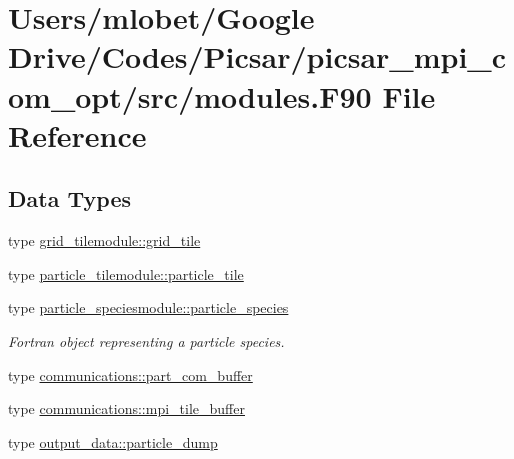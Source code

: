 \hypertarget{modules_8_f90}{}\section{Users/mlobet/\+Google Drive/\+Codes/\+Picsar/picsar\+\_\+mpi\+\_\+com\+\_\+opt/src/modules.F90 File Reference}
\label{modules_8_f90}
\subsection*{Data Types}
\begin{DoxyCompactItemize}
\item 
type \hyperlink{structgrid__tilemodule_1_1grid__tile}{grid\+\_\+tilemodule\+::grid\+\_\+tile}
\item 
type \hyperlink{structparticle__tilemodule_1_1particle__tile}{particle\+\_\+tilemodule\+::particle\+\_\+tile}
\item 
type \hyperlink{structparticle__speciesmodule_1_1particle__species}{particle\+\_\+speciesmodule\+::particle\+\_\+species}
\begin{DoxyCompactList}\small\item\em Fortran object representing a particle species. \end{DoxyCompactList}\item 
type \hyperlink{structcommunications_1_1part__com__buffer}{communications\+::part\+\_\+com\+\_\+buffer}
\item 
type \hyperlink{structcommunications_1_1mpi__tile__buffer}{communications\+::mpi\+\_\+tile\+\_\+buffer}
\item 
type \hyperlink{structoutput__data_1_1particle__dump}{output\+\_\+data\+::particle\+\_\+dump}
\end{DoxyCompactItemize}
